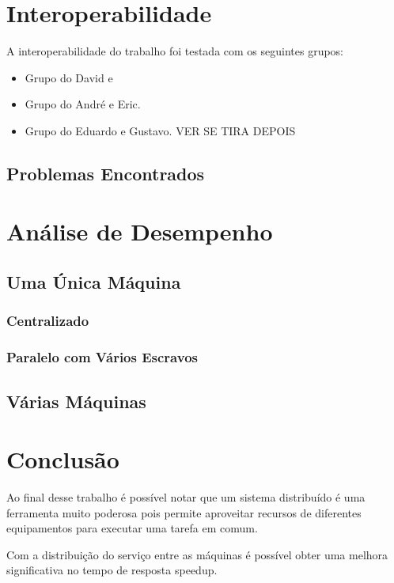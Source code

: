 \documentclass[
	12pt,				%
    oneside,			%
	a4paper,			%
	english,			%
	brazil,				%
	]{abntex2}
\begin{document}
\chapter{Interoperabilidade}
A interoperabilidade do trabalho foi testada com os seguintes grupos:
\begin{itemize}
\item Grupo do David e
\item Grupo do André e Eric.
\item Grupo do Eduardo e Gustavo.   VER SE TIRA DEPOIS
\end{itemize}

\section{Problemas Encontrados}




\chapter{Análise de Desempenho} 

\section{Uma Única Máquina}

\subsection{Centralizado}

\subsection{Paralelo com Vários Escravos}

\section{Várias Máquinas}

\chapter{Conclusão}

Ao final desse trabalho é possível notar que um sistema distribuído é uma ferramenta muito poderosa pois permite aproveitar recursos de diferentes equipamentos para executar uma tarefa em comum.

Com a distribuição do serviço entre as máquinas é possível obter uma melhora significativa no tempo de resposta speedup. 
\end{document}
